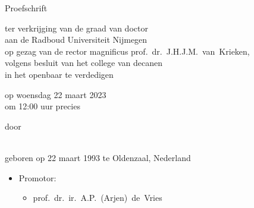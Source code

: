 \begin{titlepage}
	\begin{center}
		\vspace*{3.5cm}
		
		\huge{\bfseries\mytitle}
		
		\vspace*{15pt}
		
		
		\vspace*{5pt}
		
		\normalsize
		
		\vspace{2.0cm}
		
		Proefschrift
		
		\vspace{0.5cm}
		
		ter verkrijging van de graad van doctor\\
		aan de Radboud Universiteit Nijmegen\\
		op gezag van de rector magnificus prof.~dr.~J.H.J.M.\ van\ Krieken,\\
		volgens besluit van het college van decanen\\
		in het openbaar te verdedigen
		
		\vspace{0.5cm}
		
		op woensdag 22 maart 2023\\
		om 12:00 uur precies
		
		\vspace{0.5cm}
		
		door
		
		\vspace{0.5cm}
		
		\myauthor\\
		
		geboren op 22 maart 1993 te Oldenzaal, Nederland
	\end{center}
\end{titlepage}

\newpage%

\thispagestyle{empty}

\begin{itemize}
	\item[] Promotor:
	\begin{itemize}
		\item[] prof.\ dr.\ ir.\ A.P.\ (Arjen)\ de\ Vries
	\end{itemize}
\end{itemize}

